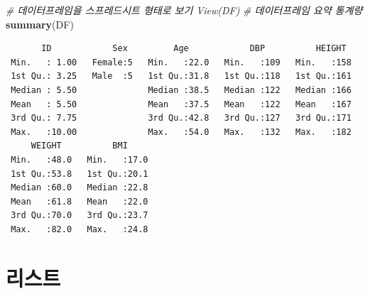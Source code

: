 \documentclass[11pt,a4paper]{book}
\newenvironment{Shaded}{\begin{snugshade}}{\end{snugshade}}
\newcommand{\KeywordTok}[1]{\textcolor[rgb]{0.13,0.29,0.53}{\textbf{#1}}}
\newcommand{\CommentTok}[1]{\textcolor[rgb]{0.56,0.35,0.01}{\textit{#1}}}
\newcommand{\NormalTok}[1]{#1}
\theoremstyle{definition}
\theoremstyle{definition}
\theoremstyle{definition}
\theoremstyle{remark}
\begin{document}
\begin{Shaded}
\begin{Highlighting}[]
\CommentTok{# 데이터프레임을 스프레드시트 형태로 보기 View(DF)}
\CommentTok{# 데이터프레임 요약 통계량}
\KeywordTok{summary}\NormalTok{(DF)}
\end{Highlighting}
\end{Shaded}

\begin{verbatim}
       ID            Sex         Age            DBP          HEIGHT   
 Min.   : 1.00   Female:5   Min.   :22.0   Min.   :109   Min.   :158  
 1st Qu.: 3.25   Male  :5   1st Qu.:31.8   1st Qu.:118   1st Qu.:161  
 Median : 5.50              Median :38.5   Median :122   Median :166  
 Mean   : 5.50              Mean   :37.5   Mean   :122   Mean   :167  
 3rd Qu.: 7.75              3rd Qu.:42.8   3rd Qu.:127   3rd Qu.:171  
 Max.   :10.00              Max.   :54.0   Max.   :132   Max.   :182  
     WEIGHT          BMI      
 Min.   :48.0   Min.   :17.0  
 1st Qu.:53.8   1st Qu.:20.1  
 Median :60.0   Median :22.8  
 Mean   :61.8   Mean   :22.0  
 3rd Qu.:70.0   3rd Qu.:23.7  
 Max.   :82.0   Max.   :24.8  
\end{verbatim}

\normalsize

\section{리스트}

\footnotesize
\end{document}
